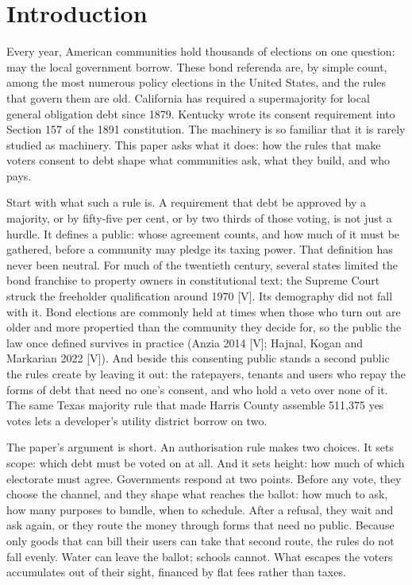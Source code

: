 \section{Introduction}
Every year, American communities hold thousands of elections on one question: may the local government borrow. These bond referenda are, by simple count, among the most numerous policy elections in the United States, and the rules that govern them are old. California has required a supermajority for local general obligation debt since 1879. Kentucky wrote its consent requirement into Section 157 of the 1891 constitution. The machinery is so familiar that it is rarely studied as machinery. This paper asks what it does: how the rules that make voters consent to debt shape what communities ask, what they build, and who pays.

Start with what such a rule is. A requirement that debt be approved by a majority, or by fifty-five per cent, or by two thirds of those voting, is not just a hurdle. It defines a public: whose agreement counts, and how much of it must be gathered, before a community may pledge its taxing power. That definition has never been neutral. For much of the twentieth century, several states limited the bond franchise to property owners in constitutional text; the Supreme Court struck the freeholder qualification around 1970 [V]. Its demography did not fall with it. Bond elections are commonly held at times when those who turn out are older and more propertied than the community they decide for, so the public the law once defined survives in practice (Anzia 2014 [V]; Hajnal, Kogan and Markarian 2022 [V]). And beside this consenting public stands a second public the rules create by leaving it out: the ratepayers, tenants and users who repay the forms of debt that need no one's consent, and who hold a veto over none of it. The same Texas majority rule that made Harris County assemble 511,375 yes votes lets a developer's utility district borrow on two.

The paper's argument is short. An authorisation rule makes two choices. It sets scope: which debt must be voted on at all. And it sets height: how much of which electorate must agree. Governments respond at two points. Before any vote, they choose the channel, and they shape what reaches the ballot: how much to ask, how many purposes to bundle, when to schedule. After a refusal, they wait and ask again, or they route the money through forms that need no public. Because only goods that can bill their users can take that second route, the rules do not fall evenly. Water can leave the ballot; schools cannot. What escapes the voters accumulates out of their sight, financed by flat fees rather than taxes.

